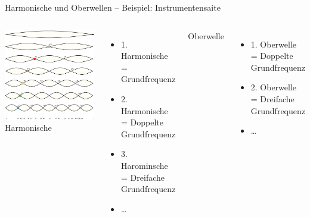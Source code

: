 \begin{frame}{Harmonische und Oberwellen -- Beispiel: Instrumentensaite}
  \begin{columns}[c]
      \includegraphics[width=\textwidth,height=\textheight,keepaspectratio]{a11/Moodswingerscale.pdf}
      {\tiny \hyperlink{refs}{\cite{wm}}}
      Harmonische
      \begin{itemize}
    \item 1. Harmonische = Grundfrequenz
    \item 2. Harmonische = Doppelte Grundfrequenz
    \item 3. Harominsche = Dreifache Grundfrequenz
    \item \ldots
      \end{itemize}
      Oberwelle
      \begin{itemize}
    \item 1. Oberwelle = Doppelte Grundfrequenz
    \item 2. Oberwelle = Dreifache Grundfrequenz
    \item \ldots
      \end{itemize}
  \end{columns}
\end{frame}

